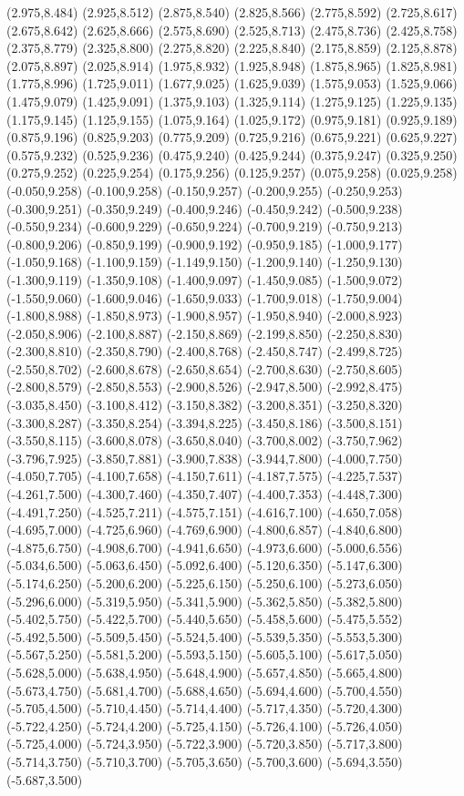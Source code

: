 (2.975,8.484) (2.925,8.512) (2.875,8.540) (2.825,8.566) (2.775,8.592) (2.725,8.617) (2.675,8.642) (2.625,8.666) (2.575,8.690) (2.525,8.713) (2.475,8.736) (2.425,8.758) (2.375,8.779) (2.325,8.800) (2.275,8.820) (2.225,8.840) (2.175,8.859) (2.125,8.878) (2.075,8.897) (2.025,8.914) (1.975,8.932) (1.925,8.948) (1.875,8.965) (1.825,8.981) (1.775,8.996) (1.725,9.011) (1.677,9.025) (1.625,9.039) (1.575,9.053) (1.525,9.066) (1.475,9.079) (1.425,9.091) (1.375,9.103) (1.325,9.114) (1.275,9.125) (1.225,9.135) (1.175,9.145) (1.125,9.155) (1.075,9.164) (1.025,9.172) (0.975,9.181) (0.925,9.189) (0.875,9.196) (0.825,9.203) (0.775,9.209) (0.725,9.216) (0.675,9.221) (0.625,9.227) (0.575,9.232) (0.525,9.236) (0.475,9.240) (0.425,9.244) (0.375,9.247) (0.325,9.250) (0.275,9.252) (0.225,9.254) (0.175,9.256) (0.125,9.257) (0.075,9.258) (0.025,9.258) (-0.050,9.258) (-0.100,9.258) (-0.150,9.257) (-0.200,9.255) (-0.250,9.253) (-0.300,9.251) (-0.350,9.249) (-0.400,9.246) (-0.450,9.242) (-0.500,9.238) (-0.550,9.234) (-0.600,9.229) (-0.650,9.224) (-0.700,9.219) (-0.750,9.213) (-0.800,9.206) (-0.850,9.199) (-0.900,9.192) (-0.950,9.185) (-1.000,9.177) (-1.050,9.168) (-1.100,9.159) (-1.149,9.150) (-1.200,9.140) (-1.250,9.130) (-1.300,9.119) (-1.350,9.108) (-1.400,9.097) (-1.450,9.085) (-1.500,9.072) (-1.550,9.060) (-1.600,9.046) (-1.650,9.033) (-1.700,9.018) (-1.750,9.004) (-1.800,8.988) (-1.850,8.973) (-1.900,8.957) (-1.950,8.940) (-2.000,8.923) (-2.050,8.906) (-2.100,8.887) (-2.150,8.869) (-2.199,8.850) (-2.250,8.830) (-2.300,8.810) (-2.350,8.790) (-2.400,8.768) (-2.450,8.747) (-2.499,8.725) (-2.550,8.702) (-2.600,8.678) (-2.650,8.654) (-2.700,8.630) (-2.750,8.605) (-2.800,8.579) (-2.850,8.553) (-2.900,8.526) (-2.947,8.500) (-2.992,8.475) (-3.035,8.450) (-3.100,8.412) (-3.150,8.382) (-3.200,8.351) (-3.250,8.320) (-3.300,8.287) (-3.350,8.254) (-3.394,8.225) (-3.450,8.186) (-3.500,8.151) (-3.550,8.115) (-3.600,8.078) (-3.650,8.040) (-3.700,8.002) (-3.750,7.962) (-3.796,7.925) (-3.850,7.881) (-3.900,7.838) (-3.944,7.800) (-4.000,7.750) (-4.050,7.705) (-4.100,7.658) (-4.150,7.611) (-4.187,7.575) (-4.225,7.537) (-4.261,7.500) (-4.300,7.460) (-4.350,7.407) (-4.400,7.353) (-4.448,7.300) (-4.491,7.250) (-4.525,7.211) (-4.575,7.151) (-4.616,7.100) (-4.650,7.058) (-4.695,7.000) (-4.725,6.960) (-4.769,6.900) (-4.800,6.857) (-4.840,6.800) (-4.875,6.750) (-4.908,6.700) (-4.941,6.650) (-4.973,6.600) (-5.000,6.556) (-5.034,6.500) (-5.063,6.450) (-5.092,6.400) (-5.120,6.350) (-5.147,6.300) (-5.174,6.250) (-5.200,6.200) (-5.225,6.150) (-5.250,6.100) (-5.273,6.050) (-5.296,6.000) (-5.319,5.950) (-5.341,5.900) (-5.362,5.850) (-5.382,5.800) (-5.402,5.750) (-5.422,5.700) (-5.440,5.650) (-5.458,5.600) (-5.475,5.552) (-5.492,5.500) (-5.509,5.450) (-5.524,5.400) (-5.539,5.350) (-5.553,5.300) (-5.567,5.250) (-5.581,5.200) (-5.593,5.150) (-5.605,5.100) (-5.617,5.050) (-5.628,5.000) (-5.638,4.950) (-5.648,4.900) (-5.657,4.850) (-5.665,4.800) (-5.673,4.750) (-5.681,4.700) (-5.688,4.650) (-5.694,4.600) (-5.700,4.550) (-5.705,4.500) (-5.710,4.450) (-5.714,4.400) (-5.717,4.350) (-5.720,4.300) (-5.722,4.250) (-5.724,4.200) (-5.725,4.150) (-5.726,4.100) (-5.726,4.050) (-5.725,4.000) (-5.724,3.950) (-5.722,3.900) (-5.720,3.850) (-5.717,3.800) (-5.714,3.750) (-5.710,3.700) (-5.705,3.650) (-5.700,3.600) (-5.694,3.550) (-5.687,3.500) 